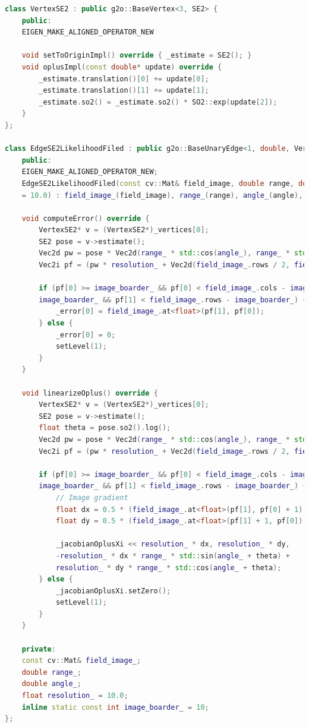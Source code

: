 \begin{lstlisting}[language=c++,caption=src/ch6/g2o\_types.h]
class VertexSE2 : public g2o::BaseVertex<3, SE2> {
	public:
	EIGEN_MAKE_ALIGNED_OPERATOR_NEW
	
	void setToOriginImpl() override { _estimate = SE2(); }
	void oplusImpl(const double* update) override {
		_estimate.translation()[0] += update[0];
		_estimate.translation()[1] += update[1];
		_estimate.so2() = _estimate.so2() * SO2::exp(update[2]);
	}
};

class EdgeSE2LikelihoodFiled : public g2o::BaseUnaryEdge<1, double, VertexSE2> {
	public:
	EIGEN_MAKE_ALIGNED_OPERATOR_NEW;
	EdgeSE2LikelihoodFiled(const cv::Mat& field_image, double range, double angle, float resolution 
	= 10.0) : field_image_(field_image), range_(range), angle_(angle), resolution_(resolution) {}
	
	void computeError() override {
		VertexSE2* v = (VertexSE2*)_vertices[0];
		SE2 pose = v->estimate();
		Vec2d pw = pose * Vec2d(range_ * std::cos(angle_), range_ * std::sin(angle_));
		Vec2i pf = (pw * resolution_ + Vec2d(field_image_.rows / 2, field_image_.cols / 2)).cast<int>(); 
		
		if (pf[0] >= image_boarder_ && pf[0] < field_image_.cols - image_boarder_ && pf[1] >= 
		image_boarder_ && pf[1] < field_image_.rows - image_boarder_) {
			_error[0] = field_image_.at<float>(pf[1], pf[0]);
		} else {
			_error[0] = 0;
			setLevel(1);
		}
	}
	
	void linearizeOplus() override {
		VertexSE2* v = (VertexSE2*)_vertices[0];
		SE2 pose = v->estimate();
		float theta = pose.so2().log();
		Vec2d pw = pose * Vec2d(range_ * std::cos(angle_), range_ * std::sin(angle_));
		Vec2i pf = (pw * resolution_ + Vec2d(field_image_.rows / 2, field_image_.cols / 2)).cast<int>();
		
		if (pf[0] >= image_boarder_ && pf[0] < field_image_.cols - image_boarder_ && pf[1] >= 
		image_boarder_ && pf[1] < field_image_.rows - image_boarder_) {
			// Image gradient
			float dx = 0.5 * (field_image_.at<float>(pf[1], pf[0] + 1) - field_image_.at<float>(pf[1], pf[0] - 1));
			float dy = 0.5 * (field_image_.at<float>(pf[1] + 1, pf[0]) - field_image_.at<float>(pf[1] - 1, pf[0]));
			
			_jacobianOplusXi << resolution_ * dx, resolution_ * dy,
			-resolution_ * dx * range_ * std::sin(angle_ + theta) +
			resolution_ * dy * range_ * std::cos(angle_ + theta);
		} else {
			_jacobianOplusXi.setZero();
			setLevel(1);
		}
	}
	
	private:
	const cv::Mat& field_image_;
	double range_;
	double angle_;
	float resolution_ = 10.0;
	inline static const int image_boarder_ = 10;
};
\end{lstlisting}

